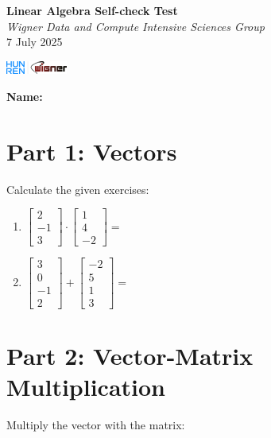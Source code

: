 \documentclass{article}
\begin{document}
\begin{minipage}{0.8\textwidth}
	\centering
	{\Large\textbf{Linear Algebra Self-check Test}\\ \textit{Wigner Data and Compute Intensive Sciences Group}}\\
	\vspace*{0.25cm}
	{\normalsize 7 July 2025}
\end{minipage}
\begin{minipage}{0.2\textwidth}
	\includegraphics[width=2cm]{img/logo.png}
\end{minipage}


\vspace{0.75cm}

\textbf{Name:} \underline{\hspace{5cm}}

\section*{Part 1: Vectors}
Calculate the given exercises:

\begin{enumerate}
\item $\begin{bmatrix} 2 \\ -1 \\ 3 \end{bmatrix} \cdot \begin{bmatrix} 1 \\ 4 \\ -2 \end{bmatrix} = $ \underline{\hspace{3cm}}

\item $\begin{bmatrix} 3 \\ 0 \\ -1 \\ 2 \end{bmatrix} + \begin{bmatrix} -2 \\ 5 \\ 1 \\ 3 \end{bmatrix} = $ \underline{\hspace{3cm}}
\end{enumerate}

\section*{Part 2: Vector-Matrix Multiplication}
Multiply the vector with the matrix:
\end{document}
